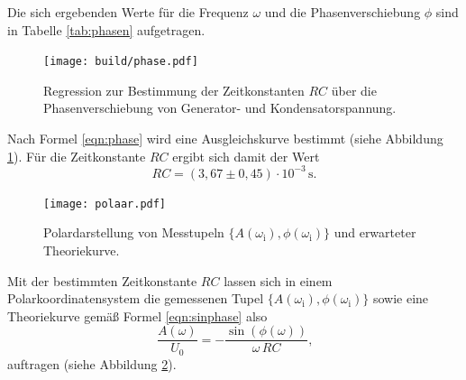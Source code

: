 Die sich ergebenden Werte für die Frequenz $\omega$ und die Phasenverschiebung $\phi$ sind in Tabelle \ref{tab:phasen} aufgetragen.
\begin{figure}
	\centering
	\texttt{[image: build/phase.pdf]}
	\caption{Regression zur Bestimmung der Zeitkonstanten $RC$ über die Phasenverschiebung von Generator- und Kondensatorspannung.}
	\label{fig:phasi}
\end{figure}
Nach Formel \eqref{eqn:phase} wird eine Ausgleichskurve bestimmt (siehe Abbildung \ref{fig:phasi}).
Für die Zeitkonstante $RC$ ergibt sich damit der Wert
\begin{equation*}
	RC = (3,67 \pm 0,45) \cdot 10^{-3} \, \si{\second} .
\end{equation*}

\begin{figure}
	\centering
	\texttt{[image: polaar.pdf]}
	\caption{Polardarstellung von Messtupeln $\{A(\omega_{\text{i}}), \phi(\omega_{\text{i}}) \}$ und erwarteter Theoriekurve.}
	\label{fig:polari}
\end{figure}

Mit der bestimmten Zeitkonstante $RC$ lassen sich in einem Polarkoordinatensystem die gemessenen Tupel $\{A(\omega_{\text{i}}), \phi(\omega_{\text{i}}) \}$ sowie eine Theoriekurve gemäß Formel \eqref{eqn:sinphase} also
\begin{equation}
	\frac{A({\omega})}{U_0} = - \frac{\sin(\phi(\omega))}{\omega \, RC} \text{,}
\end{equation}
auftragen (siehe Abbildung \ref{fig:polari}).

